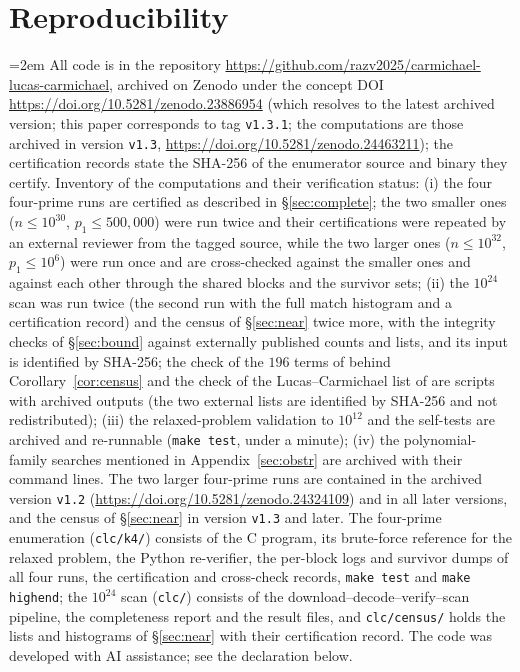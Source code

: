 \documentclass[11pt]{amsart}
\theoremstyle{definition}
\theoremstyle{remark}
\begin{document}
\section{Reproducibility}\label{sec:repro}
{\emergencystretch=2em
All code is in the repository \url{https://github.com/razv2025/carmichael-lucas-carmichael}, archived on Zenodo under the concept DOI \url{https://doi.org/10.5281/zenodo.23886954} (which resolves to the latest archived version; this paper corresponds to tag \texttt{v1.3.1}; the computations are those archived in version \texttt{v1.3}, \url{https://doi.org/10.5281/zenodo.24463211}); the certification records state the SHA-256 of the enumerator source and binary they certify. Inventory of the computations and their verification status: (i) the four four-prime runs are certified as described in \S\ref{sec:complete}; the two smaller ones ($n\le10^{30}$, $p_1\le500{,}000$) were run twice and their certifications were repeated by an external reviewer from the tagged source, while the two larger ones ($n\le10^{32}$, $p_1\le10^6$) were run once and are cross-checked against the smaller ones and against each other through the shared blocks and the survivor sets; (ii) the $10^{24}$ scan was run twice (the second run with the full match histogram and a certification record) and the census of \S\ref{sec:near} twice more, with the integrity checks of \S\ref{sec:bound} against externally published counts and lists, and its input is identified by SHA-256; the check of the $196$ terms of \cite{Pud30} behind Corollary~\ref{cor:census} and the check of the Lucas--Carmichael list of \cite{SuteuLC18} are scripts with archived outputs (the two external lists are identified by SHA-256 and not redistributed); (iii) the relaxed-problem validation to $10^{12}$ and the self-tests are archived and re-runnable (\texttt{make test}, under a minute); (iv) the polynomial-family searches mentioned in Appendix~\ref{sec:obstr} are archived with their command lines. The two larger four-prime runs are contained in the archived version \texttt{v1.2} (\url{https://doi.org/10.5281/zenodo.24324109}) and in all later versions, and the census of \S\ref{sec:near} in version \texttt{v1.3} and later. The four-prime enumeration (\texttt{clc/k4/}) consists of the C program, its brute-force reference for the relaxed problem, the Python re-verifier, the per-block logs and survivor dumps of all four runs, the certification and cross-check records, \texttt{make test} and \texttt{make highend}; the $10^{24}$ scan (\texttt{clc/}) consists of the download--decode--verify--scan pipeline, the completeness report and the result files, and \texttt{clc/census/} holds the lists and histograms of \S\ref{sec:near} with their certification record. The code was developed with AI assistance; see the declaration below.
\par}
\end{document}

